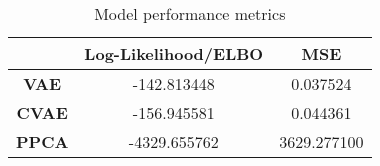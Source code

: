 \begin{table}
\centering
\caption{Model performance metrics}
\label{table:metrics}
\begin{tabular}{ccc}
\toprule
{} &  \textbf{Log-Likelihood/ELBO} &  \textbf{MSE} \\
\midrule
\textbf{VAE } &                   -142.813448 &      0.037524 \\
\textbf{CVAE} &                   -156.945581 &      0.044361 \\
\textbf{PPCA} &                  -4329.655762 &   3629.277100 \\
\bottomrule
\end{tabular}
\end{table}
